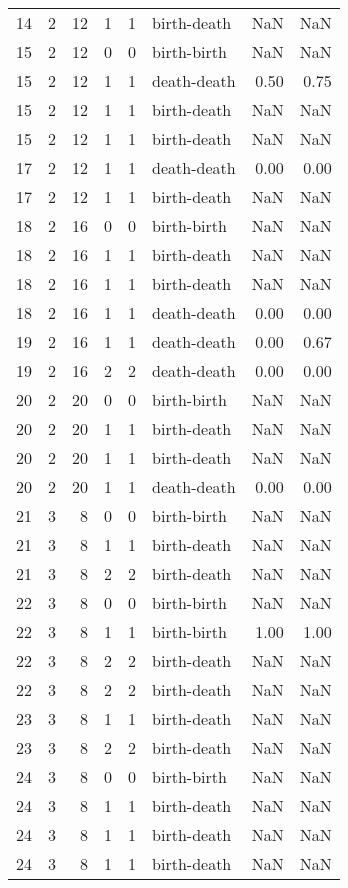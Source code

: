 \documentclass{article}
\begin{document}
\begin{center}
\begin{tabular}{rrrrrlrr}
14 & 2 & 12 & 1 & 1 & birth-death & NaN & NaN \\
15 & 2 & 12 & 0 & 0 & birth-birth & NaN & NaN \\
15 & 2 & 12 & 1 & 1 & death-death & 0.50 & 0.75 \\
15 & 2 & 12 & 1 & 1 & birth-death & NaN & NaN \\
15 & 2 & 12 & 1 & 1 & birth-death & NaN & NaN \\
17 & 2 & 12 & 1 & 1 & death-death & 0.00 & 0.00 \\
17 & 2 & 12 & 1 & 1 & birth-death & NaN & NaN \\
18 & 2 & 16 & 0 & 0 & birth-birth & NaN & NaN \\
18 & 2 & 16 & 1 & 1 & birth-death & NaN & NaN \\
18 & 2 & 16 & 1 & 1 & birth-death & NaN & NaN \\
18 & 2 & 16 & 1 & 1 & death-death & 0.00 & 0.00 \\
19 & 2 & 16 & 1 & 1 & death-death & 0.00 & 0.67 \\
19 & 2 & 16 & 2 & 2 & death-death & 0.00 & 0.00 \\
20 & 2 & 20 & 0 & 0 & birth-birth & NaN & NaN \\
20 & 2 & 20 & 1 & 1 & birth-death & NaN & NaN \\
20 & 2 & 20 & 1 & 1 & birth-death & NaN & NaN \\
20 & 2 & 20 & 1 & 1 & death-death & 0.00 & 0.00 \\
21 & 3 & 8 & 0 & 0 & birth-birth & NaN & NaN \\
21 & 3 & 8 & 1 & 1 & birth-death & NaN & NaN \\
21 & 3 & 8 & 2 & 2 & birth-death & NaN & NaN \\
22 & 3 & 8 & 0 & 0 & birth-birth & NaN & NaN \\
22 & 3 & 8 & 1 & 1 & birth-birth & 1.00 & 1.00 \\
22 & 3 & 8 & 2 & 2 & birth-death & NaN & NaN \\
22 & 3 & 8 & 2 & 2 & birth-death & NaN & NaN \\
23 & 3 & 8 & 1 & 1 & birth-death & NaN & NaN \\
23 & 3 & 8 & 2 & 2 & birth-death & NaN & NaN \\
24 & 3 & 8 & 0 & 0 & birth-birth & NaN & NaN \\
24 & 3 & 8 & 1 & 1 & birth-death & NaN & NaN \\
24 & 3 & 8 & 1 & 1 & birth-death & NaN & NaN \\
24 & 3 & 8 & 1 & 1 & birth-death & NaN & NaN \\

\end{tabular}
\end{center}
\end{document}
